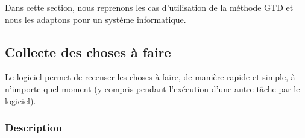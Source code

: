 Dans cette section, nous reprenons les cas d'utilisation de la méthode GTD et nous les adaptons pour un système informatique.
	\subsection{Collecte des choses à faire}

Le logiciel permet de recenser les choses à faire, de manière rapide et simple, à n'importe quel moment (y compris pendant l'exécution d'une autre tâche par le logiciel).


	\subsubsection{Description}

